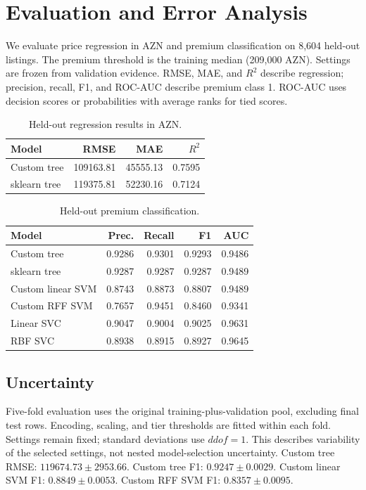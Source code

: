 \section{Evaluation and Error Analysis}
We evaluate price regression in AZN and premium classification on 8,604 held-out listings. The premium threshold is the training median (209,000 AZN). Settings are frozen from validation evidence. RMSE, MAE, and $R^2$ describe regression; precision, recall, F1, and ROC-AUC describe premium class 1. ROC-AUC uses decision scores or probabilities with average ranks for tied scores.

\begin{table}[ht]
\centering\scriptsize
\caption{Held-out regression results in AZN.}
\begin{tabular}{lrrr}
\toprule
Model & RMSE & MAE & $R^2$ \\
\midrule
Custom tree & 109163.81 & 45555.13 & 0.7595 \\
sklearn tree & 119375.81 & 52230.16 & 0.7124 \\
\bottomrule
\end{tabular}
\end{table}
\begin{table}[ht]
\centering\scriptsize
\caption{Held-out premium classification.}
\begin{tabular}{lrrrr}
\toprule
Model & Prec. & Recall & F1 & AUC \\
\midrule
Custom tree & 0.9286 & 0.9301 & 0.9293 & 0.9486 \\
sklearn tree & 0.9287 & 0.9287 & 0.9287 & 0.9489 \\
Custom linear SVM & 0.8743 & 0.8873 & 0.8807 & 0.9489 \\
Custom RFF SVM & 0.7657 & 0.9451 & 0.8460 & 0.9341 \\
Linear SVC & 0.9047 & 0.9004 & 0.9025 & 0.9631 \\
RBF SVC & 0.8938 & 0.8915 & 0.8927 & 0.9645 \\
\bottomrule
\end{tabular}
\end{table}
\subsection{Uncertainty}
Five-fold evaluation uses the original training-plus-validation pool, excluding final test rows. Encoding, scaling, and tier thresholds are fitted within each fold. Settings remain fixed; standard deviations use $ddof=1$. This describes variability of the selected settings, not nested model-selection uncertainty.
Custom tree RMSE: $119674.73 \pm 2953.66$. Custom tree F1: $0.9247 \pm 0.0029$. Custom linear SVM F1: $0.8849 \pm 0.0053$. Custom RFF SVM F1: $0.8357 \pm 0.0095$.
